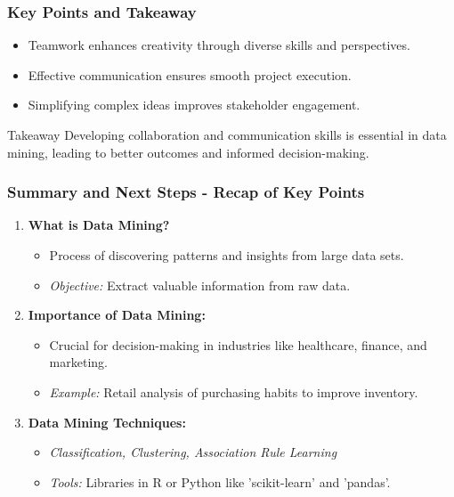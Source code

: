 \documentclass{beamer}
\begin{document}
\begin{frame}[fragile]
    \frametitle{Key Points and Takeaway}
    \begin{itemize}
        \item Teamwork enhances creativity through diverse skills and perspectives.
        \item Effective communication ensures smooth project execution.
        \item Simplifying complex ideas improves stakeholder engagement.
    \end{itemize}

    \begin{block}{Takeaway}
        Developing collaboration and communication skills is essential in data mining, leading to better outcomes and informed decision-making.
    \end{block}
\end{frame}

\begin{frame}[fragile]
    \frametitle{Summary and Next Steps - Recap of Key Points}
    
    \begin{enumerate}
        \item \textbf{What is Data Mining?}
        \begin{itemize}
            \item Process of discovering patterns and insights from large data sets.
            \item \textit{Objective:} Extract valuable information from raw data.
        \end{itemize}
        
        \item \textbf{Importance of Data Mining:}
        \begin{itemize}
            \item Crucial for decision-making in industries like healthcare, finance, and marketing.
            \item \textit{Example:} Retail analysis of purchasing habits to improve inventory.
        \end{itemize}
        
        \item \textbf{Data Mining Techniques:}
        \begin{itemize}
            \item \textit{Classification, Clustering, Association Rule Learning}
            \item \textit{Tools:} Libraries in R or Python like 'scikit-learn' and 'pandas'.
        \end{itemize}
    \end{enumerate}
\end{frame}
\end{document}
